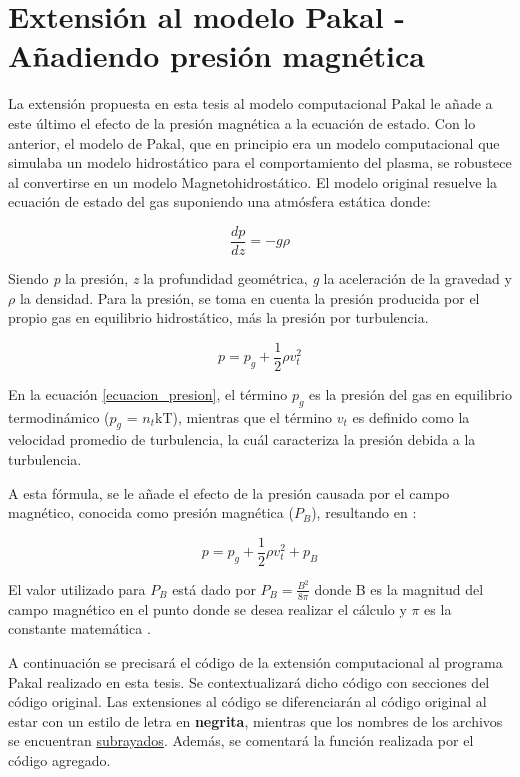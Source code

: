 \chapter{Extensi\'on al modelo Pakal \-- A\~nadiendo presi\'on magn\'etica}

La extensi\'on propuesta en esta tesis al modelo computacional Pakal le a\~nade a este \'ultimo el efecto de la presi\'on magn\'etica a la ecuaci\'on de estado. Con lo anterior, el modelo de Pakal, que en principio era un modelo computacional que simulaba un modelo hidrost\'atico para el comportamiento del plasma, se robustece al convertirse en un modelo Magnetohidrost\'atico. El modelo original resuelve la ecuaci\'on de estado del gas suponiendo una atm\'osfera est\'atica donde:

\begin{equation} \label{ecuacion_hidrostatica}
\frac{dp}{dz} = -g\rho
\end{equation}

Siendo \textit{p} la presi\'on, \textit{z} la profundidad geom\'etrica, \textit{g} la aceleraci\'on de la gravedad y \textit{$\rho$} la densidad. Para la presi\'on, se toma en cuenta la presi\'on producida por el propio gas en equilibrio hidrost\'atico, m\'as la presi\'on por turbulencia.

\begin{equation} \label{ecuacion_presion}
p = p_g + \frac{1}{2}\rho v_t^2
\end{equation}

En la ecuaci\'on \ref{ecuacion_presion}, el t\'ermino $p_g$ es la presi\'on del gas en equilibrio termodin\'amico ($p_g$ = $n_t$kT), mientras que el t\'ermino $v_t$ es definido como la velocidad promedio de turbulencia, la cu\'al caracteriza la presi\'on debida a la turbulencia.

A esta f\'ormula, se le a\~nade el efecto de la presi\'on causada por el campo magn\'etico, conocida como presi\'on magn\'etica ($P_B$), resultando en \citep{priest}: 

\begin{equation} \label{mhs}
p = p_g + \frac{1}{2}\rho v_t^2 + p_B
\end{equation}

El valor utilizado para $P_B$ est\'a dado por $P_B = \frac{B^2}{8\pi}$ donde B es la magnitud del campo magn\'etico en el punto donde se desea realizar el c\'alculo y $\pi$ es la constante matem\'atica \citep{PBvalue}. 

A continuaci\'on se precisar\'a el c\'odigo de la extensi\'on computacional al programa Pakal realizado en esta tesis. Se contextualizar\'a dicho c\'odigo con secciones del c\'odigo original. Las extensiones al c\'odigo se diferenciar\'an al c\'odigo original al estar con un estilo de letra en \textbf{negrita}, mientras que los nombres de los archivos se encuentran \underline{subrayados}. Adem\'as, se comentar\'a la funci\'on realizada por el c\'odigo agregado. 

